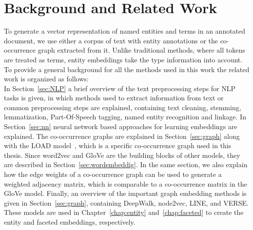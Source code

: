 
\chapter{Background and Related Work}\label{chap:background}
To generate a vector representation of named entities and terms in an annotated document, we use either a corpus of text with entity annotations or the co-occurrence graph extracted from it. Unlike traditional methods, where all tokens are treated as terms, entity embeddings take the type information into account. To provide a general background for all the methods used in this work the related work is organized as follows:\\
In Section~\ref{sec:NLP} a brief overview of the text preprocessing steps for NLP tasks is given, in which methods used to extract information from text or common preprocessing steps are explained, containing text cleaning, stemming, lemmatization, Part-Of-Speech tagging, named entity recognition and linkage. In Section~\ref{sec:nn} neural network based approaches for learning embeddings are explained. The co-occurrence graphs are explained in Section~\ref{sec:graph} along with the LOAD model~, which is a specific co-occurrence graph used in this thesis. Since word2vec and GloVe are the building blocks of other models, they are described in Section~\ref{sec:wordembeddig}. In the same section, we also explain how the edge weights of a co-occurrence graph can be used to generate a weighted adjacency matrix, which is comparable to a co-occurrence matrix in the GloVe model.  Finally, an overview of the important graph embedding methods is given in Section~\ref{sec:graph}, containing DeepWalk, node2vec, LINE, and VERSE. These models are used  in Chapter~\ref{chap:entity} and~\ref{chap:faceted} to create the entity and faceted embeddings, respectively. 


